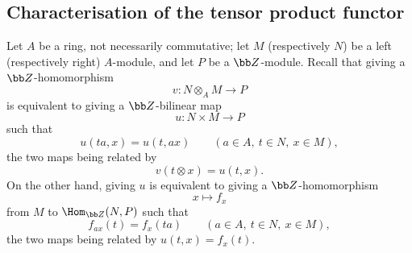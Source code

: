 \subsection{Characterisation of the tensor product functor}
\label{subsection:III.7.2}

\begin{env}[7.2.1]
\label{III.7.2.1}
Let $A$ be a ring, not necessarily commutative; let $M$
(respectively $N$) be a left (respectively right) $A$-module,
and let $P$ be a $\bb Z$-module.  Recall that giving a
$\bb Z$-homomorphism
\[
  v:N\otimes_A M\longrightarrow P
\]
is equivalent to giving a $\bb Z$-bilinear map
\[
  u:N\times M\longrightarrow P
\]
such that
\[
  u(ta,x)=u(t,ax)
  \qquad(a\in A,\ t\in N,\ x\in M),
\]
the two maps being related by
\[
  v(t\otimes x)=u(t,x).
\]
On the other hand, giving $u$ is equivalent to giving a
$\bb Z$-homomorphism
\[
  x\longmapsto f_x
\]
from $M$ to $\Hom_{\bb Z}(N,P)$ such that
\[
  f_{ax}(t)=f_x(ta)
  \qquad(a\in A,\ t\in N,\ x\in M),
\]
the two maps being related by $u(t,x)=f_x(t)$.
\end{env}

